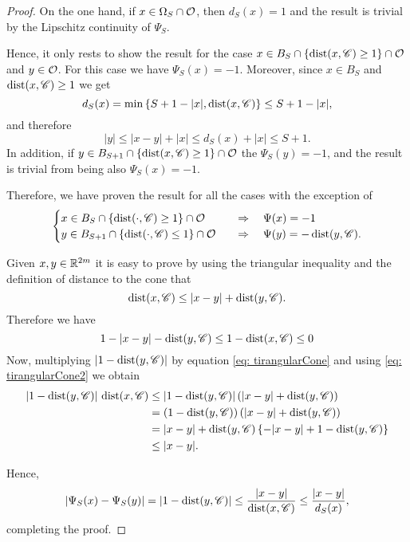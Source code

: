 \begin{proof}
On the one hand, if $x\in \Omega_S \cap \mathcal{O}$, then $d_S(x)=1$ and the result is trivial by the Lipschitz continuity of $\Psi_S$. 

Hence, it only rests to show the result for the case $x\in B_S\cap \{\operatorname{dist}(x,\mathscr{C})\geq 1\} \cap \mathcal{O}$ and $y\in \mathcal{O}$. For this case we have $\Psi_S(x)=-1$. Moreover, since $x\in B_S$ and $\operatorname{dist}(x,\mathscr{C})\geq 1$ we get
$$ d_S(x) = \min\left\{S+1-|x|,\operatorname{dist}(x,\mathscr{C})\right\} \leq S+1-|x|,$$
and therefore
$$ |y|\leq |x-y| + |x| \leq d_S(x)+|x| \leq S+1. $$
In addition, if $y\in B_{S+1} \cap \{\operatorname{dist}(x,\mathscr{C})\geq 1\}\cap \mathcal{O}$ the $\Psi_S(y)=-1$, and the result is trivial from being also $\Psi_S(x)=-1$.

Therefore, we have proven the result for all the cases with the exception of
$$\begin{cases}
x\in B_S \cap \{\dist(\cdot,\ccal)\geq 1\}\cap \ocal \ \ \ &\Rightarrow \ \ \ \Psi(x)=-1 \\
y\in B_{S+1} \cap \{\dist(\cdot,\ccal)\leq 1\}\cap \ocal \ \ \ &\Rightarrow \ \ \ \Psi(y)=-\dist(y,\ccal). \\
\end{cases}$$

Given $x,y \in \mathbb{R}^{2m}$ it is easy to prove by using the triangular inequality and the definition of distance to the cone that
\begin{equation} \label{eq: tirangularCone}
\operatorname{dist}(x,\mathscr{C}) \leq |x-y| + \operatorname{dist}(y,\mathscr{C}).
\end{equation}
Therefore we have
\begin{equation} \label{eq: tirangularCone2}
1-|x-y|-\operatorname{dist}(y,\mathscr{C}) \leq 1-\operatorname{dist}(x,\mathscr{C}) \leq 0
\end{equation}
Now, multiplying $|1-\operatorname{dist}(y,\mathscr{C})|$ by equation \eqref{eq: tirangularCone} and using \eqref{eq: tirangularCone2} we obtain
\begin{align*}
|1-\operatorname{dist}(y,\mathscr{C})|\,\operatorname{dist}(x,\mathscr{C}) &\leq |1-\operatorname{dist}(y,\mathscr{C})| \left(|x-y| + \operatorname{dist}(y,\mathscr{C})\right) \\
&= \left(1-\operatorname{dist}(y,\mathscr{C})\right) \left(|x-y| + \operatorname{dist}(y,\mathscr{C})\right) \\
&= |x-y|+\operatorname{dist}(y,\mathscr{C}) \left\{ -|x-y|+ 1- \operatorname{dist}(y,\mathscr{C}) \right\} \\
&\leq |x-y|.
\end{align*}

Hence,
$$ |\Psi_S(x)-\Psi_S(y)| = |1-\operatorname{dist}(y,\mathscr{C})| \leq \frac{|x-y|}{\operatorname{dist}(x,\mathscr{C})} \leq  \frac{|x-y|}{d_S(x)},$$
completing the proof.
\end{proof}

